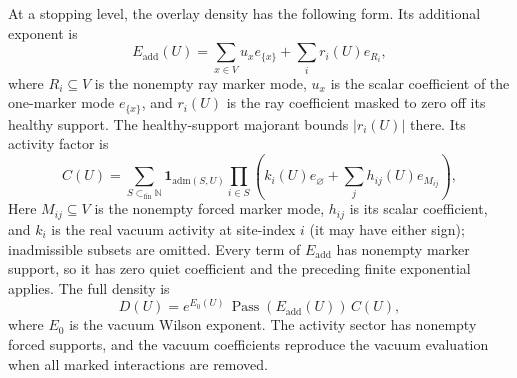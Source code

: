 At a stopping level, the overlay density has the following form. Its additional exponent is
\[
 E_{\mathrm{add}}(U)=\sum_{x\in V}u_x e_{\{x\}}+\sum_i r_i(U)e_{R_i},
\]
where $R_i\subseteq V$ is the nonempty ray marker mode, $u_x$ is the scalar coefficient of the one-marker mode $e_{\{x\}}$, and $r_i(U)$ is the ray coefficient masked to zero off its healthy support. The healthy-support majorant bounds $|r_i(U)|$ there. Its activity factor is
\[
 C(U)=\sum_{S\subset_{\mathrm{fin}}\mathbb N} \mathbf1_{\mathrm{adm}(S,U)}
       \prod_{i\in S}\left(k_i(U)e_{\varnothing}+\sum_j h_{ij}(U)e_{M_{ij}}\right),
\]
Here $M_{ij}\subseteq V$ is the nonempty forced marker mode, $h_{ij}$ is its scalar coefficient, and $k_i$ is the real vacuum activity at site-index $i$ (it may have either sign); inadmissible subsets are omitted. Every term of $E_{\mathrm{add}}$ has nonempty marker support, so it has zero quiet coefficient and the preceding finite exponential applies. The full density is
\[
 D(U)=e^{E_0(U)}\,\operatorname{Pass}(E_{\mathrm{add}}(U))\,C(U),
\]
where $E_0$ is the vacuum Wilson exponent. The activity sector has nonempty forced supports, and the vacuum coefficients reproduce the vacuum evaluation when all marked interactions are removed.

